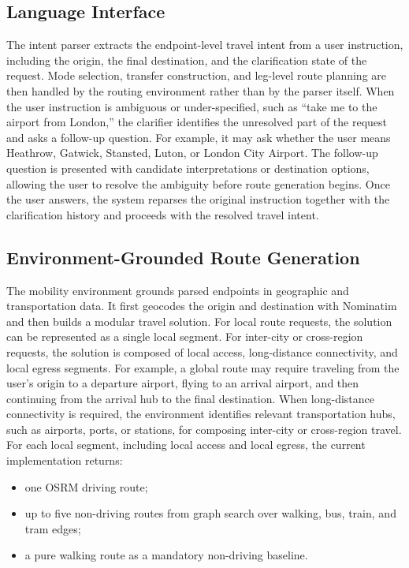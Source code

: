 \documentclass[11pt]{article}
\begin{document}
\subsection{Language Interface}
The intent parser extracts the endpoint-level travel intent from a user instruction, including the origin, the final destination, and the clarification state of the request. Mode selection, transfer construction, and leg-level route planning are then handled by the routing environment rather than by the parser itself. When the user instruction is ambiguous or under-specified, such as ``take me to the airport from London,'' the clarifier identifies the unresolved part of the request and asks a follow-up question. For example, it may ask whether the user means Heathrow, Gatwick, Stansted, Luton, or London City Airport. The follow-up question is presented with candidate interpretations or destination options, allowing the user to resolve the ambiguity before route generation begins. Once the user answers, the system reparses the original instruction together with the clarification history and proceeds with the resolved travel intent.

\subsection{Environment-Grounded Route Generation}
The mobility environment grounds parsed endpoints in geographic and transportation data. It first geocodes the origin and destination with Nominatim~\citep{nominatim_2026} and then builds a modular travel solution. For local route requests, the solution can be represented as a single local segment. For inter-city or cross-region requests, the solution is composed of local access, long-distance connectivity, and local egress segments. For example, a global route may require traveling from the user's origin to a departure airport, flying to an arrival airport, and then continuing from the arrival hub to the final destination. When long-distance connectivity is required, the environment identifies relevant transportation hubs, such as airports, ports, or stations, for composing inter-city or cross-region travel. For each local segment, including local access and local egress, the current implementation returns:

\begin{itemize}[leftmargin=*]
\item one OSRM driving route;
\item up to five non-driving routes from graph search over walking, bus, train, and tram edges;
\item a pure walking route as a mandatory non-driving baseline.
\end{itemize}
\end{document}
